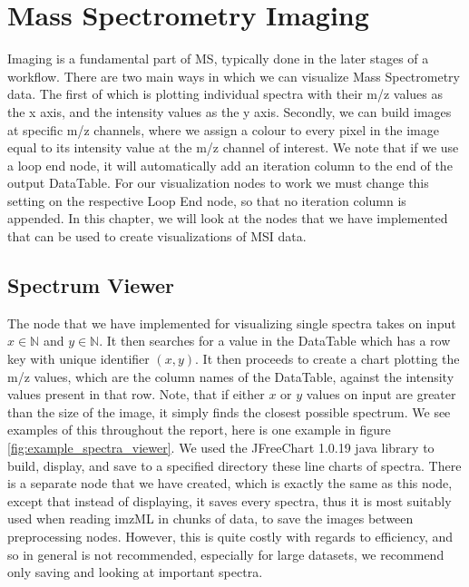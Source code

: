 \documentclass[11pt,openany]{book}
\begin{document}
\chapter{Mass Spectrometry Imaging}
Imaging is a fundamental part of MS, typically done in the later stages of a workflow. There are two main ways in which we can visualize Mass Spectrometry data. The first of which is plotting individual spectra with their m/z values as the x axis, and the intensity values as the y axis. Secondly, we can build images at specific m/z channels, where we assign a colour to every pixel in the image equal to its intensity value at the m/z channel of interest. We note that if we use a loop end node, it will automatically add an iteration column to the end of the output DataTable. For our visualization nodes to work we must change this setting on the respective Loop End node, so that no iteration column is appended. In this chapter, we will look at the nodes that we have implemented that can be used to create visualizations of MSI data. 

\section{Spectrum Viewer}
The node that we have implemented for visualizing single spectra takes on input $x \in \mathbb{N}$ and $y \in \mathbb{N}$. It then searches for a value in the DataTable  which has a row key with unique identifier $(x,y)$. It then proceeds to create a chart plotting the m/z values, which are the column names of the DataTable, against the intensity values present in that row. Note, that if either $x$ or $y$ values on input are greater than the size of the image, it simply finds the closest possible spectrum. We see examples of this throughout the report, here is one example in figure \ref{fig:example_spectra_viewer}. We used the JFreeChart 1.0.19 java library to build, display, and save to a specified directory these line charts of spectra. There is a separate node that we have created, which is exactly the same as this node, except that instead of displaying, it saves every spectra, thus it is most suitably used when reading imzML in chunks of data, to save the images between preprocessing nodes. However, this is quite costly with regards to efficiency, and so in general is not recommended, especially for large datasets, we recommend only saving and looking at important spectra.
\end{document}
